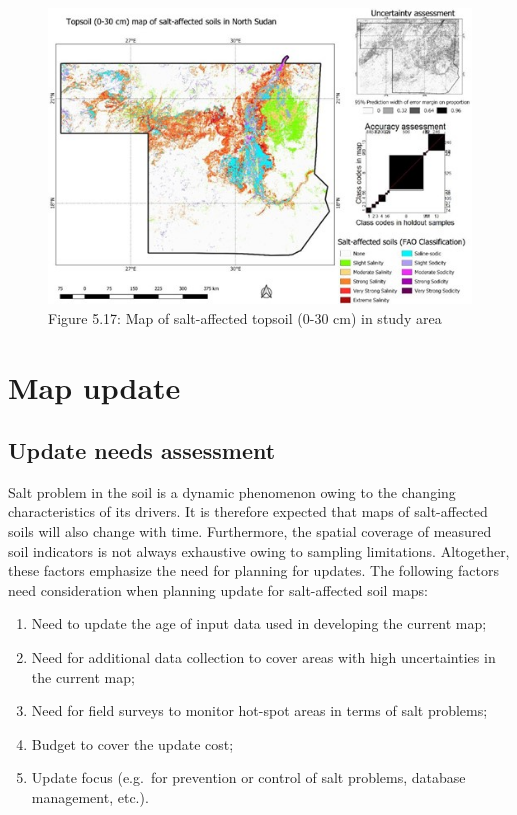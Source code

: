 \documentclass[
  10pt,
  b5paper,
]{book}
\providecommand{\tightlist}{%
  \setlength{\itemsep}{0pt}\setlength{\parskip}{0pt}}
\begin{document}
\begin{figure}
\centering
\includegraphics{figures/images/Figure5.17.jpg}
\caption{Figure 5.17: Map of salt-affected topsoil (0-30 cm) in study area}
\end{figure}

\hypertarget{map-update}{%
\section{Map update}\label{map-update}}

\hypertarget{update-needs-assessment}{%
\subsection{Update needs assessment}\label{update-needs-assessment}}

Salt problem in the soil is a dynamic phenomenon owing to the changing characteristics of its drivers. It is therefore expected that maps of salt-affected soils will also change with time. Furthermore, the spatial coverage of measured soil indicators is not always exhaustive owing to sampling limitations. Altogether, these factors emphasize the need for planning for updates. The following factors need consideration when planning update for salt-affected soil maps:

\begin{enumerate}
\def\labelenumi{\alph{enumi})}
\tightlist
\item
  Need to update the age of input data used in developing the current map;
\item
  Need for additional data collection to cover areas with high uncertainties in the current map;
\item
  Need for field surveys to monitor hot-spot areas in terms of salt problems;
\item
  Budget to cover the update cost;
\item
  Update focus (e.g.~for prevention or control of salt problems, database management, etc.).
\end{enumerate}
\end{document}
